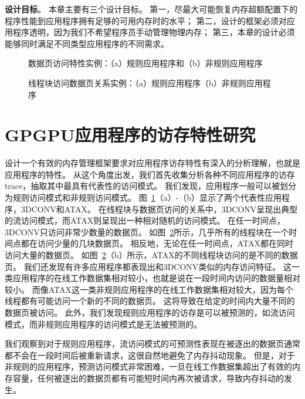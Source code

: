 \textbf{设计目标}。
本章主要有三个设计目标。
第一，尽最大可能恢复内存超额配置下的程序性能到应用程序拥有足够的可用内存时的水平；
第二，设计的框架必须对应用程序透明，因为我们不希望程序员手动管理物理内存；
第三，本章的设计必须能够同时满足不同类型应用程序的不同需求。

\begin{figure}[htb]
\centering
{} \qquad
{}  
\caption{数据页访问特性实例：（a）规则应用程序和（b）非规则应用程序}
\label{fig:Trace_1}
\end{figure}


\begin{figure}[htb]
\centering
{} \qquad
{} 
\caption{线程块访问数据页关系实例：（a）规则应用程序（b）非规则应用程序}
\label{fig:Trace_2}
\end{figure}

\section{GPGPU应用程序的访存特性研究}
\label{sec:etcfeature}
设计一个有效的内存管理框架要求对应用程序访存特性有深入的分析理解，也就是应用程序的特性。
从这个角度出发，我们首先收集分析各种不同应用程序的访存trace，抽取其中最具有代表性的访问模式。
我们发现，应用程序一般可以被划分为规则访问模式和非规则访问模式。
图~\ref{fig:Trace_1}（a）-（b）显示了两个代表性应用程序，3DCONV和ATAX。
在线程块与数据页访问的关系中，3DCONV呈现出典型的流访问模式，而ATAX则呈现出一种相对随机的访问模式。
在任一时间点，3DCONV只访问非常少数量的数据页。
如图~\ref{fig:Trace_2}所示，几乎所有的线程块在一个时间点都在访问少量的几块数据页。
相反地，无论在任一时间点，ATAX都在同时访问大量的数据页。
如图~\ref{fig:Trace_2}（b）所示，ATAX的不同线程块访问的是不同的数据页。
我们还发现有许多应用程序都表现出和3DCONV类似的内存访问特征。
这一类应用程序的在线工作数据集相对较小，也就是说在一段时间内访问的数据量相对较小。
而像ATAX这一类非规则应用程序的在线工作数据集相对较大，因为每个线程都有可能访问一个新的不同的数据页。
这将导致在给定的时间内大量不同的数据页被访问。
此外，我们发现规则应用程序的访存是可以被预测的，如流访问模式，而非规则应用程序的访问模式是无法被预测的。


我们观察到对于规则应用程序，流访问模式的可预测性表现在被逐出的数据页通常都不会在一段时间后被重新请求，这很自然地避免了内存抖动现象。
但是，对于非规则的应用程序，预测访问模式非常困难，一旦在线工作数据集超出了有效的内存容量，任何被逐出的数据页都有可能短时间内再次被请求，导致内存抖动的发生。

